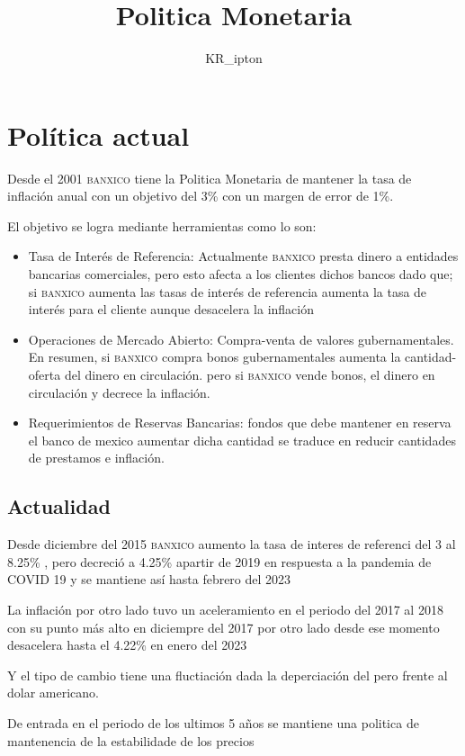 \documentclass{article}
\title{Politica Monetaria}
\author{KR\_ipton}
\theoremstyle{mytheoremstyle}
\theoremstyle{mytheoremstyle}
\theoremstyle{myproblemstyle}
\begin{document}
    \maketitle
\section{Política actual}
Desde el 2001 \textsc{banxico} tiene la Politica Monetaria de mantener la tasa de inflación anual
con un objetivo del 3\% con un margen de error de 1\%.

El objetivo se logra mediante herramientas como lo son:

\begin{itemize}
    \item Tasa de Interés de Referencia: Actualmente \textsc{banxico}
    presta dinero a entidades bancarias comerciales, pero esto afecta a los clientes
    dichos bancos dado que; si \textsc{banxico} aumenta las tasas de interés de referencia
    aumenta la tasa de interés para el cliente aunque desacelera la inflación
    \item Operaciones de Mercado Abierto: Compra-venta de valores gubernamentales.
    En resumen, si \textsc{banxico} compra bonos gubernamentales aumenta la cantidad-oferta del dinero en circulación.
    pero si \textsc{banxico} vende bonos, el dinero en circulación y decrece la inflación.
    \item Requerimientos de Reservas Bancarias: fondos que debe mantener en reserva el banco de mexico
    aumentar dicha cantidad se traduce en reducir cantidades de prestamos e inflación. 

\end{itemize}

  \subsection{Actualidad}

    Desde diciembre del 2015  \textsc{banxico} aumento la tasa de interes de referenci del 3 al 8.25\% , pero decreció a 4.25\% apartir de 2019
    en respuesta a la pandemia de COVID 19 y se mantiene así hasta febrero del 2023

    La inflación por otro lado tuvo un aceleramiento en el periodo del 2017 al 2018 con su punto más alto en diciempre del 2017
    por otro lado desde ese momento desacelera hasta el 4.22\% en enero del 2023

    
    Y el tipo de cambio tiene una fluctiación dada la deperciación del pero frente al dolar americano.

    De entrada en el periodo de los ultimos 5 años se mantiene una politica de mantenencia de  la estabilidade de los precios
    
\end{document}
